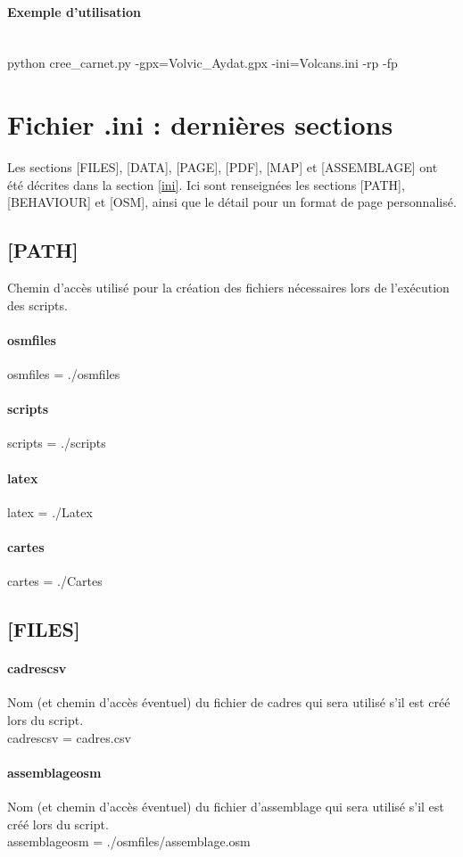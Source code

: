 \documentclass[12pt,french]{article}
\begin{document}
\paragraph{Exemple d'utilisation}\mbox{}\\
python cree\_carnet.py -gpx=Volvic\_Aydat.gpx -ini=Volcans.ini -rp -fp

\section{Fichier .ini : dernières sections}
Les sections [FILES], [DATA], [PAGE], [PDF], [MAP] et [ASSEMBLAGE] ont été décrites dans la section \ref{ini}. Ici sont renseignées les sections [PATH], [BEHAVIOUR] et [OSM], ainsi que le détail pour un format de page personnalisé.

\subsection{[PATH]}
Chemin d'accès utilisé pour la création des fichiers nécessaires lors de l'exécution des scripts. 
\paragraph{osmfiles} osmfiles = ./osmfiles
\paragraph{scripts} scripts = ./scripts
\paragraph{latex} latex = ./Latex
\paragraph{cartes} cartes = ./Cartes

\subsection{[FILES]}
\paragraph{cadrescsv} Nom (et chemin d'accès éventuel) du fichier de cadres qui sera utilisé s'il est créé lors du script.\\
cadrescsv = cadres.csv
\paragraph{assemblageosm} Nom (et chemin d'accès éventuel) du fichier d'assemblage qui sera utilisé s'il est créé lors du script.\\
assemblageosm = ./osmfiles/assemblage.osm
\end{document}
